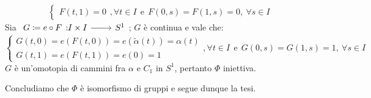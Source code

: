 \begin{demonstration}
\begin{itemize}
\begin{equation*}
\begin{cases}
					F(t,1)=0
				\end{cases},\forall t\in I\ \ \text{e}\ \
				F(0,s)=F(1,s)=0,\ \forall s\in I
			\end{equation*}
				Sia $\funz {G\coloneqq e\circ F} {I\times I} {S^1}$; $G$ è continua e vale che:
				\begin{equation*}
					\begin{cases}
						G(t,0)=e(F(t,0))=e(\widetilde{\alpha}(t))=\alpha(t)\\
						G(t,1)=e(F(t,1))=e(0)=1
					\end{cases},\forall t\in I\ \ \text{e}\ \ 
					G(0,s)=G(1,s)=1,\ \forall s\in I
				\end{equation*}
			$G$ è un'omotopia di cammini fra $\alpha$ e $C_1$ in $S^1$, pertanto $\Phi$ iniettiva.
		\end{itemize}
	Concludiamo che $\Phi$ è isomorfismo di gruppi e segue dunque la tesi.
\end{demonstration}
